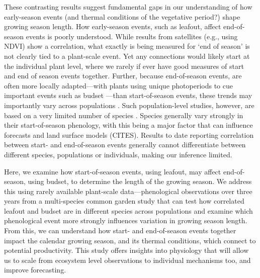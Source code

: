 \documentclass{article}[12pt]
\begin{document}
These contrasting results suggest fundamental gaps in our understanding of how early-season events (and thermal conditions of the vegetative period?) shape growing season length. How early-season events, such as leafout, affect end-of-season events is poorly understood. While results from satellites (e.g., using NDVI) show a correlation,  what exactly is being measured for `end of season' is not clearly tied to a plant-scale event. Yet any connections would likely start at the individual plant level, where we rarely if ever have good measures of start and end of season events together. Further, because end-of-season events, are often more locally adapted---with plants using unique photoperiods to cue important events such as budset \citep{bauerle2012photoperiodic,soolanayakanahally2013timing}---than start-of-season events, these trends may importantly vary across populations \citep{aitken2016}. Such population-level studies, however, are based on a very limited number of species \citep{Zeng2024}. Species generally vary strongly in their start-of-season phenology, with this being a major factor that can influence forecasts \citep{Morales-Castilla2024} and land surface models (CITES). Results to date reporting correlation between start- and end-of-season events generally cannot differentiate between different species, populations or individuals, making our inference limited. 

Here, we examine how start-of-season events, using leafout, may affect end-of-season, using budset, to determine the length of the growing season.
We address this using rarely available plant-scale data---phenological observations over three years from a multi-species common garden study that can test how correlated leafout and budset are in different species across populations and examine which phenological event more strongly influences variation in growing season length. From this, we can understand how start- and end-of-season events together impact the calendar growing season, and its thermal conditions, which connect to potential productivity. This study offers insights into physiology that will allow us to scale from ecosystem level observations to individual mechanisms too, and improve forecasting. %
\end{document}
